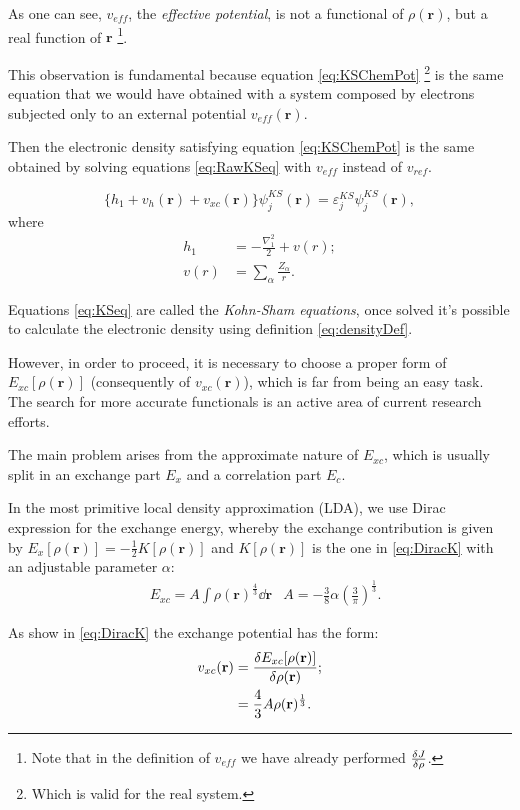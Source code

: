 \documentclass[a4paper,12pt]{article}
\newcommand\dens{\rho(\mathbf{r})}
\newcommand\erre{\mathbf{r}}
\begin{document}
As one can see, $v_{eff}$, the \textit{effective potential}, is not a functional of $\dens$, but a real function of $\erre$
\footnote{Note that in the definition of $v_{eff}$ we have already performed $\frac{\var{J}}{\var{\rho}}$.}.

This observation is fundamental because equation \eqref{eq:KSChemPot} \footnote{Which is valid for the real system.} is the same equation that we would have obtained with a system composed by electrons subjected only to an external potential $v_{eff}(\erre)$.

Then the electronic density satisfying equation \eqref{eq:KSChemPot} is the same obtained by solving equations \eqref{eq:RawKSeq} with $v_{eff}$ instead of $v_{ref}$.

\begin{equation} \label{eq:KSeq}
\boxed{
	\lbrace h_{1} + v_{h}(\erre)+ v_{xc}(\erre) \rbrace 
		\psi_{j}^{KS}(\erre) 
	= \varepsilon_{j}^{KS} \psi_{j}^{KS}(\erre)
},
\end{equation}
where 
\begin{align}
	h_{1} &= - \frac{\nabla_{1}^2}{2} + v(r);	\\
	v(r) &= \sum_{\alpha} \frac{Z_{\alpha}}{r} .
\end{align}

Equations \eqref{eq:KSeq} are called the \textit{Kohn-Sham equations}, once solved it's possible to calculate the electronic density using definition \eqref{eq:densityDef}.

However, in order to proceed, it is necessary to choose a proper form of $E_{xc}[\dens]$ (consequently of $v_{xc}(\erre)$), which is far from being an easy task. The search for more accurate functionals is an active area of current research efforts.

The main problem arises from the approximate nature of $E_{xc}$, which is usually split in an exchange part $E_{x}$ and a correlation part $E_c$.

In the most primitive local density approximation (LDA), we use Dirac expression for the exchange energy, whereby the exchange contribution is given by $E_{x}[\dens] = -\frac{1}{2} K[\dens]$ and $K[\dens]$ is the one in \eqref{eq:DiracK} with an adjustable parameter $\alpha$:
\begin{align}
	&E_{xc} = A \int \dens^{\frac{4}{3}} \dd{\erre} &A= -\frac{3}{8}\alpha \left( \frac{3}{\pi} \right)^{\frac{1}{3}}.
\end{align}

As show in \eqref{eq:DiracK} the exchange potential has the form:
\begin{align}
	v_{xc}(\erre) &=	\frac{\var{E_{xc}[\dens]}}{\var{\dens}};\\
	&= \frac{4}{3} A \dens^{\frac{1}{3}} .
\end{align}
\end{document}
